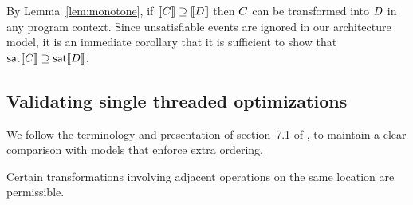 By Lemma~\ref{lem:monotone}, if $\llbracket C\rrbracket \supseteq \llbracket D\rrbracket$
then $C$ can be transformed into $D$ in any program context.  Since
unsatisfiable events are ignored in our architecture model, it is
an immediate corollary that it is sufficient to show that
$\mathsf{sat}\llbracket C\rrbracket \supseteq \mathsf{sat}\llbracket D\rrbracket$.



\subsection{Validating single threaded optimizations}
We follow the terminology and presentation of section~7.1 of
\citet{Dolan:2018:BDR:3192366.3192421}, to maintain a clear comparison with
models that enforce extra ordering.

Certain transformations involving adjacent operations on the same location
are permissible. 
 

